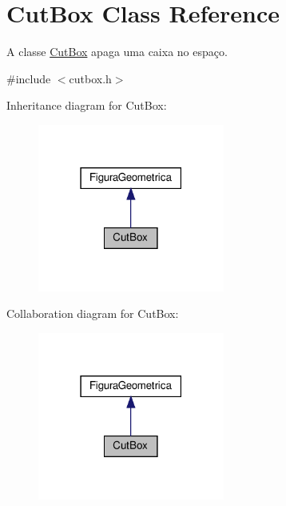 \hypertarget{class_cut_box}{}\section{Cut\+Box Class Reference}
\label{class_cut_box}


A classe \hyperlink{class_cut_box}{Cut\+Box} apaga uma caixa no espaço.  




{\ttfamily \#include $<$cutbox.\+h$>$}



Inheritance diagram for Cut\+Box\+:
\nopagebreak
\begin{figure}[H]
\begin{center}
\leavevmode
\includegraphics[width=174pt]{class_cut_box__inherit__graph}
\end{center}
\end{figure}


Collaboration diagram for Cut\+Box\+:
\nopagebreak
\begin{figure}[H]
\begin{center}
\leavevmode
\includegraphics[width=174pt]{class_cut_box__coll__graph}
\end{center}
\end{figure}
